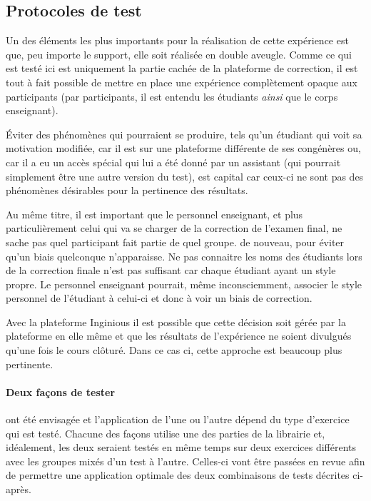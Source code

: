 \documentclass[a4paper]{report}
\begin{document}
\subsection{Protocoles de test}

Un des éléments les plus importants pour la réalisation de cette expérience est que, peu importe le support, elle soit réalisée en double aveugle.
Comme ce qui est testé ici est uniquement la partie cachée de la plateforme de correction, il est tout à fait possible de mettre en place une expérience complètement opaque aux participants (par participants, il est entendu les étudiants \textit{ainsi} que le corps enseignant).

Éviter des phénomènes qui pourraient se produire, tels qu'un étudiant qui voit sa motivation modifiée, car il est sur une plateforme différente de ses congénères ou, car il a eu un accès spécial qui lui a été donné par un assistant (qui pourrait simplement être une autre version du test), est capital car ceux-ci ne sont pas des phénomènes désirables pour  la pertinence des résultats.

Au même titre, il est important que le personnel enseignant, et plus particulièrement celui qui va se charger de la correction de l'examen final, ne sache pas quel participant fait partie de quel groupe.
de nouveau, pour éviter qu'un biais quelconque n'apparaisse.
Ne pas connaitre les noms des étudiants lors de la correction finale n'est pas suffisant car chaque étudiant ayant un style propre.
Le personnel enseignant pourrait, même inconsciemment, associer le style personnel de l'étudiant à celui-ci et donc à voir un biais de correction.

Avec la plateforme Inginious il est possible que cette décision soit gérée par la plateforme en elle même et que les résultats de l'expérience ne soient divulgués qu'une fois le cours clôturé.
Dans ce cas ci, cette approche est beaucoup plus pertinente.

\paragraph{Deux façons de tester} ont été envisagée et l'application de l'une ou l'autre dépend du type d'exercice qui est testé.
Chacune des façons utilise une des parties de la librairie et, idéalement, les deux seraient testés en même temps sur deux exercices différents avec les groupes mixés d'un test à l'autre.
Celles-ci vont être passées en revue afin de permettre une application optimale des deux combinaisons de tests décrites ci-après.
\end{document}
